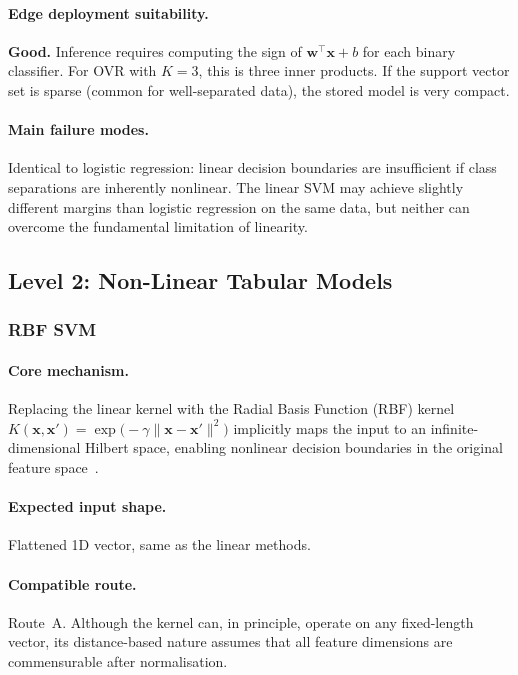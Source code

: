 \paragraph{Edge deployment suitability.}
\textbf{Good.}  Inference requires computing the sign of
$\mathbf{w}^\top \mathbf{x} + b$ for each binary classifier.  For
OVR with $K=3$, this is three inner products.  If the support vector
set is sparse (common for well-separated data), the stored model is
very compact.

\paragraph{Main failure modes.}
Identical to logistic regression: linear decision boundaries are
insufficient if class separations are inherently nonlinear.  The linear
SVM may achieve slightly different margins than logistic regression on
the same data, but neither can overcome the fundamental limitation of
linearity.



\subsection{Level 2: Non-Linear Tabular Models}\label{subsec:level2}
\subsubsection{RBF SVM}\label{subsec:rbfsvm}

\paragraph{Core mechanism.}
Replacing the linear kernel with the Radial Basis Function (RBF)
kernel
$K(\mathbf{x}, \mathbf{x}') = \exp\!\bigl(-\gamma \|\mathbf{x} -
\mathbf{x}'\|^2\bigr)$
implicitly maps the input to an infinite-dimensional Hilbert space,
enabling nonlinear decision boundaries in the original feature
space~\cite{vapnik1995svm}.

\paragraph{Expected input shape.}
Flattened 1D vector, same as the linear methods.

\paragraph{Compatible route.}
Route~A.  Although the kernel can, in principle, operate on any fixed-length
vector, its distance-based nature assumes that all feature dimensions are
commensurable after normalisation.

